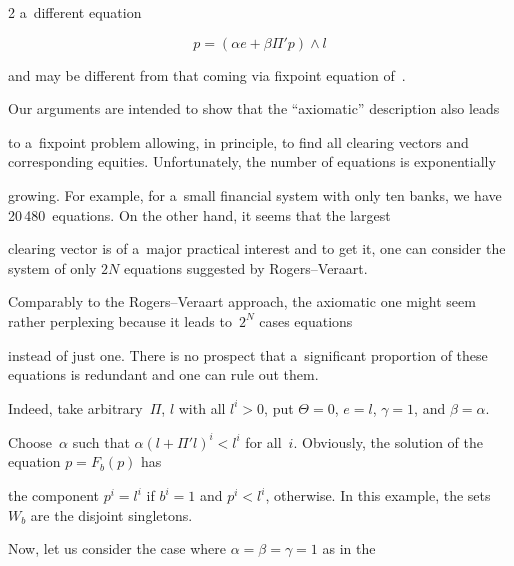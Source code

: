 \begin{multicols}{2}
a~different equation



\noindent

$$ 

p = \left(\alpha e+\beta \Pi' p \right) \wedge l

$$



\vspace*{-4pt}



\noindent

and may be different  from that coming via fixpoint equation of~\cite{RV2013}. 



Our arguments are intended to show that  the  ``axiomatic'' description also leads 

to a~fixpoint problem allowing, in principle, to find all clearing vectors and corresponding equities. Unfortunately, the number of equations is exponentially 

growing. For example, for a~small financial system with only ten banks,  we have  20\,480~equations. On the other hand, it seems that the largest 

clearing vector is of a~major practical interest and to get it, one  can consider the system of only $2N$ equations suggested by Rogers--Veraart.   





Comparably to the  Rogers--Veraart approach, the axiomatic one might seem rather perplexing because it leads to~$2^N$ cases equations

 instead of just one. There is no  prospect that a~significant proportion of these equations is redundant and one can rule out them. 

 Indeed, take arbitrary~$\Pi$, $l$ with all  $l^i > 0$, put $\Theta = 0$, $e = l$, $\gamma = 1$, and $\beta=\alpha$. 

 Choose~$\alpha$ such that $\alpha (l + \Pi' l)^i < l^i$ for all~$i$. Obviously, the solution of the equation $p = F_b(p)$ has  

 the component  $p^i = l^i$ if $b^i=1$ and $p^i < l^i$, otherwise. In this example, the sets~$W_b$ are the disjoint singletons.

 





Now, let us consider the case where $\alpha = \beta = \gamma = 1$ as in the  


\end{multicols}
